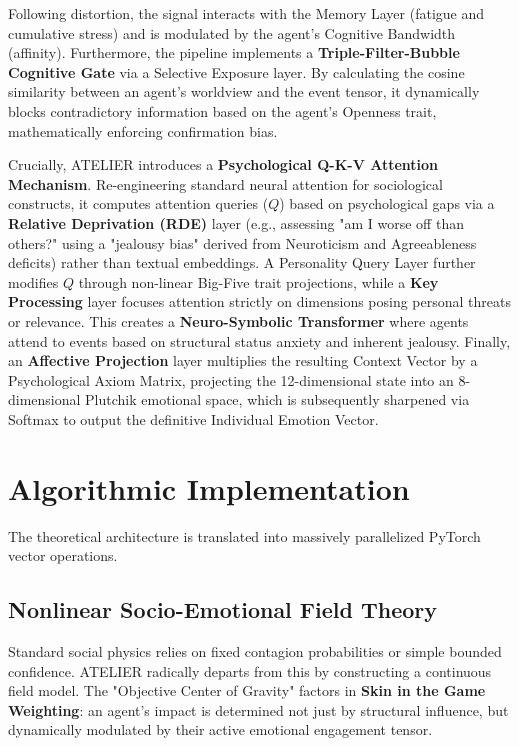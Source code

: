 \documentclass[12pt]{IEEEtran}
\begin{document}
Following distortion, the signal interacts with the Memory Layer (fatigue and cumulative stress) and is modulated by the agent's Cognitive Bandwidth (affinity). Furthermore, the pipeline implements a \textbf{Triple-Filter-Bubble Cognitive Gate} via a Selective Exposure layer. By calculating the cosine similarity between an agent's worldview and the event tensor, it dynamically blocks contradictory information based on the agent's Openness trait, mathematically enforcing confirmation bias.

Crucially, ATELIER introduces a \textbf{Psychological Q-K-V Attention Mechanism}. Re-engineering standard neural attention \cite{vaswani2017attention} for sociological constructs, it computes attention queries ($Q$) based on psychological gaps via a \textbf{Relative Deprivation (RDE)} layer (e.g., assessing "am I worse off than others?" using a "jealousy bias" derived from Neuroticism and Agreeableness deficits) rather than textual embeddings. A Personality Query Layer further modifies $Q$ through non-linear Big-Five trait projections, while a \textbf{Key Processing} layer focuses attention strictly on dimensions posing personal threats or relevance. This creates a \textbf{Neuro-Symbolic Transformer} where agents attend to events based on structural status anxiety and inherent jealousy. Finally, an \textbf{Affective Projection} layer multiplies the resulting Context Vector by a Psychological Axiom Matrix, projecting the 12-dimensional state into an 8-dimensional Plutchik emotional space, which is subsequently sharpened via Softmax to output the definitive Individual Emotion Vector.

\section{Algorithmic Implementation}
\label{sec:implementation}

The theoretical architecture is translated into massively parallelized PyTorch vector operations.

\subsection{Nonlinear Socio-Emotional Field Theory}
Standard social physics relies on fixed contagion probabilities or simple bounded confidence. ATELIER radically departs from this by constructing a continuous field model. The "Objective Center of Gravity" factors in \textbf{Skin in the Game Weighting}: an agent's impact is determined not just by structural influence, but dynamically modulated by their active emotional engagement tensor.
\end{document}
